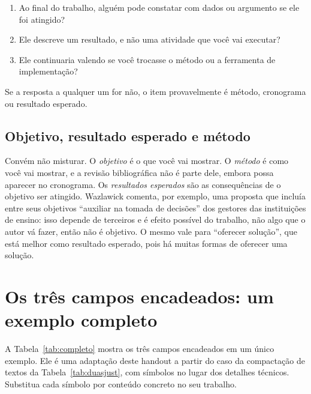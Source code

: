 \documentclass[10pt,a4paper]{extarticle}
\theoremstyle{definition}
\begin{document}
\begin{keybox}
\begin{enumerate}[label=\textbf{\arabic*.}]
  \item Ao final do trabalho, alguém pode constatar com dados ou argumento se ele foi atingido?
  \item Ele descreve um resultado, e não uma atividade que você vai executar?
  \item Ele continuaria valendo se você trocasse o método ou a ferramenta de implementação?
\end{enumerate}
Se a resposta a qualquer um for não, o item provavelmente é método, cronograma ou resultado esperado.
\end{keybox}

\subsection{Objetivo, resultado esperado e método}

Convém não misturar. O \emph{objetivo} é o que você vai mostrar. O \emph{método} é como você vai mostrar, e a revisão bibliográfica não é parte dele, embora possa aparecer no cronograma. Os \emph{resultados esperados} são as consequências de o objetivo ser atingido. Wazlawick comenta, por exemplo, uma proposta que incluía entre seus objetivos \enquote{auxiliar na tomada de decisões} dos gestores das instituições de ensino: isso depende de terceiros e é efeito possível do trabalho, não algo que o autor vá fazer, então não é objetivo. O mesmo vale para \enquote{oferecer solução}, que está melhor como resultado esperado, pois há muitas formas de oferecer uma solução.

\pagebreak
\section{Os três campos encadeados: um exemplo completo}\label{sec:exemplo}

A Tabela~\ref{tab:completo} mostra os três campos encadeados em um único exemplo. Ele é uma adaptação deste handout a partir do caso da compactação de textos da Tabela~\ref{tab:duasjust}, com símbolos no lugar dos detalhes técnicos. Substitua cada símbolo por conteúdo concreto no seu trabalho.
\end{document}
